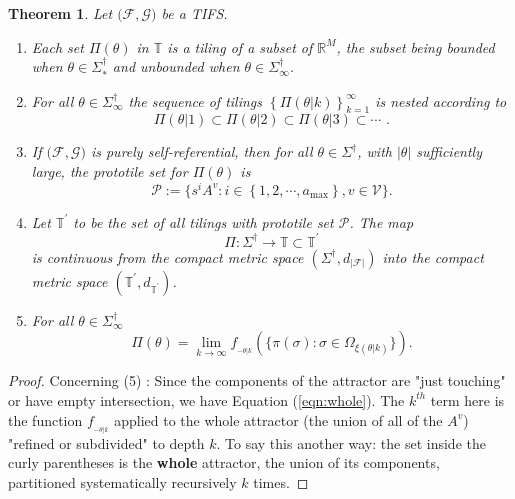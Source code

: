 \documentclass{amsproc}
\newtheorem{theorem}{Theorem}
\theoremstyle{plain}
\theoremstyle{definition}
\numberwithin{equation}{section}
\begin{document}
\begin{theorem}
\label{thm:three} Let $(\mathcal{F},\mathcal{G)}$ be a TIFS.

\begin{enumerate}
\item Each set $\Pi(\theta)$ in $\mathbb{T}$ is a tiling of a subset of $%
\mathbb{R}^{M}$, the subset being bounded when $\theta\in{\Sigma}_{\ast
}^{\dag}$ and unbounded when $\theta\in{\Sigma}_{\infty}^{\dag}$.

\item For all $\theta\in{\Sigma}_{\infty}^{\dag}$ the sequence of tilings $%
\left\{ \Pi(\theta|k)\right\} _{k=1}^{\infty}$ is nested according to 
\begin{equation}
\Pi(\theta|1)\subset\Pi(\theta|2)\subset\Pi(\theta|3)\subset\cdots\text{ .}
\label{eqthmONE}
\end{equation}

\item If $(\mathcal{F},\mathcal{G)}$ is purely self-referential, then for
all $\theta\in{\Sigma}^{\dag}$, with $\left\vert \theta\right\vert $
sufficiently large, the prototile set for $\Pi(\theta)$ is 
\begin{equation*}
\mathcal{P}:=\{s^{i}A^{v}:i\in\left\{ 1,2,\cdots,a_{\max}\right\} ,v\in%
\mathcal{V}\}.
\end{equation*}

\item \textit{Let }$\mathbb{T}^{\prime}$ to be the set of all tilings with
prototile set $\mathcal{P}$. \textit{The map}%
\begin{equation*}
\Pi:{\Sigma}^{\dag}\rightarrow\mathbb{T\subset T}^{\prime}
\end{equation*}
is continuous from the compact metric space $\left( {\Sigma}^{\dag
},d_{\left\vert \mathcal{F}\right\vert }\right) $ into the compact metric
space $(\mathbb{T}^{\prime},d_{\mathbb{T}^{\prime}})$.

\item For all $\theta\in{\Sigma}_{\infty}^{\dag}$ 
\begin{equation}
\Pi(\theta)=\lim_{k\rightarrow\infty}f_{_{-\theta|k}}(\{\pi\left(
\sigma\right) :\sigma\in\Omega_{\xi(\theta|k)}\}).  \label{eqn:whole}
\end{equation}
\end{enumerate}
\end{theorem}

\begin{proof}
Concerning (5) : Since the components of the attractor are "just touching"
or have empty intersection, we have Equation (\ref{eqn:whole}). The $k^{th}$
term here is the function $f_{_{-\theta|k}}$ applied to the whole attractor
(the union of all of the $A^{v}$) "refined or subdivided" to depth $k$. To
say this another way: the set inside the curly parentheses is the \textbf{%
whole} attractor, the union of its components, partitioned systematically
recursively $k$ times.
\end{proof}
\end{document}
